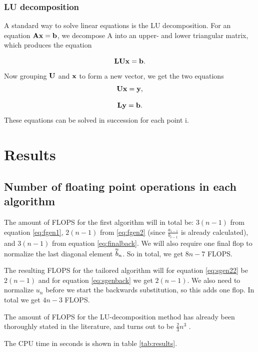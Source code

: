 \documentclass{emulateapj}
\newcommand{\dbtilde}[1]{\accentset{\approx}{#1}}
\begin{document}
\subsubsection{LU decomposition}
A standard way to solve linear equations is the LU decomposition. For an equation $\bold{A}\bold{x} = \bold{b}$, we decompose A into an upper- and lower triangular matrix, which produces the equation

\begin{equation} \label{eq:LU1}
    \bold{L}\bold{U} \bold{x} = \bold{b}.
\end{equation}
Now grouping $\bold{U}$ and $\bold{x}$ to form a new vector, we get the two equations
\begin{equation} \label{eq:LU2}
    \bold{U}\bold{x} = \bold{y},
\end{equation}

\begin{equation} \label{eq:LU2}
    \bold{L}\bold{y} = \bold{b}.
\end{equation}
These equations can be solved in succession for each point i.

\section{Results}
\label{sec:results}
\subsection{Number of floating point operations in each algorithm}

The amount of FLOPS for the first algorithm will in total be: $3\left(n-1\right)$ from equation \ref{eq:fgen1}, $2\left(n-1\right)$ from \ref{eq:fgen2} (since $\frac{a_{i-1}}{b_{i-1}}$ is already calculated), and $3\left(n-1\right)$ from equation \ref{eq:finalback}. We will also require one final flop to normalize the last diagonal element $\dbtilde{b}_n$. So in total, we get $8n - 7$ FLOPS.

The resulting FLOPS for the tailored algorithm will for equation \ref{eq:sgen22} be $2\left(n-1\right)$ and for equation \ref{eq:sgenback} we get $2\left(n-1\right)$. We also need to normalize $u_n$ before we start the backwards substitution, so this adds one flop. In total we get $4n-3$ FLOPS.

The amount of FLOPS for the LU-decomposition method has already been thoroughly stated in the literature, and turns out to be $\frac{2}{3}n^3$ \cite{MHJ}.

The CPU time in seconds is shown in table \ref{tab:results}.
\end{document}
